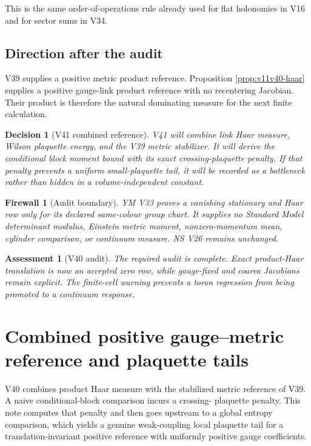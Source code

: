 \documentclass[11pt]{article}
\newtheorem{assessment}[theorem]{Assessment}
\newtheorem{firewall}[theorem]{Firewall}
\newtheorem{decision}[theorem]{Decision}
\begin{document}
This is the same order-of-operations rule already used for flat
holonomies in V16 and for sector sums in V34.

\subsection{Direction after the audit}

V39 supplies a positive metric product reference.  Proposition
\ref{prop:v11v40-haar} supplies a positive gauge-link product reference
with no recentering Jacobian.  Their product is therefore the natural
dominating measure for the next finite calculation.

\begin{decision}[V41 combined reference]
\label{dec:v11v40-next}
V41 will combine link Haar measure, Wilson plaquette energy, and the V39
metric stabilizer.  It will derive the conditional block moment bound
with its exact crossing-plaquette penalty.  If that penalty prevents a
uniform small-plaquette tail, it will be recorded as a bottleneck rather
than hidden in a volume-independent constant.
\end{decision}

\begin{firewall}[Audit boundary]
\label{fw:v11v40-boundary}
YM V33 proves a vanishing stationary and Haar row only for its declared
same-colour group chart.  It supplies no Standard Model determinant
modulus, Einstein metric moment, nonzero-momentum mean, cylinder
comparison, or continuum measure.  NS V26 remains unchanged.
\end{firewall}

\begin{assessment}[V40 audit]
\label{ass:v11v40}
The required audit is complete.  Exact product-Haar translation is now
an accepted zero row, while gauge-fixed and coarea Jacobians remain
explicit.  The finite-cell warning prevents a toron regression from
being promoted to a continuum response.
\end{assessment}
\section{Combined positive gauge--metric reference and plaquette tails}
\label{sec:v11v41}

V40 combines product Haar measure with the stabilized metric reference
of V39.  A naive conditional-block comparison incurs a crossing-
plaquette penalty.  This note computes that penalty and then goes
upstream to a global entropy comparison, which yields a genuine
weak-coupling local plaquette tail for a translation-invariant positive
reference with uniformly positive gauge coefficients.
\end{document}
